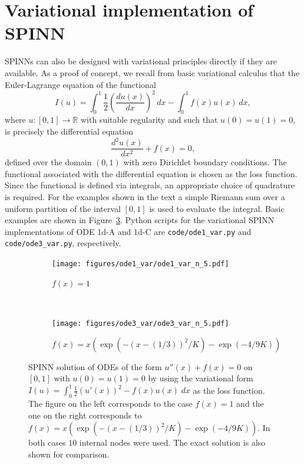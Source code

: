 \documentclass[12pt]{article}
\newcommand{\code}[1]{\lstinline{#1}}
\begin{document}
\section{Variational implementation of SPINN}
SPINNs can also be designed with variational principles directly if they are available. As a proof of concept, we recall from basic variational calculus that the Euler-Lagrange equation of the functional
\begin{displaymath}
I(u) = \int_0^1 \frac{1}{2} \left(\frac{du(x)}{dx}\right)^2 \, dx - \int_0^1 f(x) u(x) \, dx,
\end{displaymath}
where $u:[0,1]\to\mathbb{R}$ with suitable regularity and such that $u(0) = u(1) = 0$, is precisely the differential equation
\begin{displaymath}
\frac{d^2u (x)}{dx^2} + f(x) = 0,
\end{displaymath}
defined over the domain $(0,1)$ with zero Dirichlet boundary conditions. The functional associated with the differential equation is chosen as the loss function. Since the functional is defined via integrals, an appropriate choice of quadrature is required. For the examples shown in the text a simple Riemann sum over a uniform partition of the interval $[0,1]$ is used to evaluate the integral. Basic examples are shown in Figure~\ref{fig:var_spinn_1d}. Python scripts for the variational SPINN implementations of ODE 1d-A and 1d-C are  \code{code/ode1_var.py} and \code{code/ode3_var.py}, respectively.

\begin{figure}
\begin{subfigure}{0.5\textwidth}
\texttt{[image: figures/ode1\_var/ode1\_var\_n\_5.pdf]}
\caption{$f(x) = 1$}
\label{var_spinn_1d_basic}
\end{subfigure}
~
\begin{subfigure}{0.5\textwidth}
\texttt{[image: figures/ode3\_var/ode3\_var\_n\_5.pdf]}
\caption{$f(x) = x(\exp (-(x - (1/3))^2/K) - \exp (-4/9K))$}
\label{var_spinn_1d_bump}
\end{subfigure}
\caption{SPINN solution of ODEs of the form $u''(x) + f(x) = 0$ on $[0,1]$ with $u(0) = u(1) = 0$ by using the variational form $I(u) = \int_0^1 \frac{1}{2}(u'(x))^2 - f(x)u(x) \; dx$ as the loss function. The figure on the left corresponds to the case $f(x) = 1$ and the one on the right corresponds to $f(x) = x(\exp (-(x - (1/3))^2/K) - \exp (-4/9K))$. In both cases $10$ internal nodes were used. The exact solution is also shown for comparison.}
\label{fig:var_spinn_1d}
\end{figure}
\end{document}
